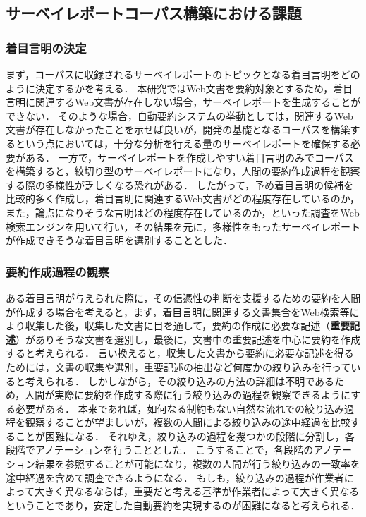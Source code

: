 \documentclass[japanese]{jnlp_1.4}
\begin{document}
\subsection{サーベイレポートコーパス構築における課題}
\label{ssc:survey_report_problems}

\subsubsection{着目言明の決定}

まず，コーパスに収録されるサーベイレポートのトピックとなる着目言明をどのように決定するかを考える．
本研究ではWeb文書を要約対象とするため，着目言明に関連するWeb文書が存在しない場合，サーベイレポートを生成することができない．
そのような場合，自動要約システムの挙動としては，関連するWeb文書が存在しなかったことを示せば良いが，開発の基礎となるコーパスを構築するという点においては，十分な分析を行える量のサーベイレポートを確保する必要がある．
一方で，サーベイレポートを作成しやすい着目言明のみでコーパスを構築すると，紋切り型のサーベイレポートになり，人間の要約作成過程を観察する際の多様性が乏しくなる恐れがある．
したがって，予め着目言明の候補を比較的多く作成し，着目言明に関連するWeb文書がどの程度存在しているのか，また，論点になりそうな言明はどの程度存在しているのか，といった調査をWeb検索エンジンを用いて行い，その結果を元に，多様性をもったサーベイレポートが作成できそうな着目言明を選別することとした．


\subsubsection{要約作成過程の観察}

{ある}着目言明が与えられた際に，その信憑性の判断を支援するための要約を人間が作成する場合を考えると，まず，着目言明に関連する文書集合をWeb検索等により収集した後，収集した文書に目を通して，要約の作成に必要な記述（{\bf 重要記述}）がありそうな文書を選別し，最後に，文書中の重要記述を中心に要約を作成すると考えられる．
言い換えると，収集した文書から要約に必要な記述を得るためには，文書の収集や選別，重要記述の抽出など何度かの絞り込みを行っていると考えられる．
しかしながら，その絞り込みの方法の詳細は不明であるため，人間が実際に要約を作成する際に行う絞り込みの過程を観察できるようにする必要がある．
本来であれば，如何なる制約もない自然な流れでの絞り込み過程を観察することが望ましいが，複数の人間による絞り込みの途中経過を比較することが困難になる．
それゆえ，絞り込みの過程を幾つかの段階に分割し，各段階でアノテーションを行うこととした．
こうすることで，各段階のアノテーション結果を参照することが可能になり，複数の人間が行う絞り込みの一致率を途中経過を含めて調査できるようになる．
もしも，絞り込みの過程が作業者によって大きく異なるならば，重要だと考える基準が作業者によって大きく異なるということであり，安定した自動要約を実現するのが困難になると考えられる．
\end{document}
